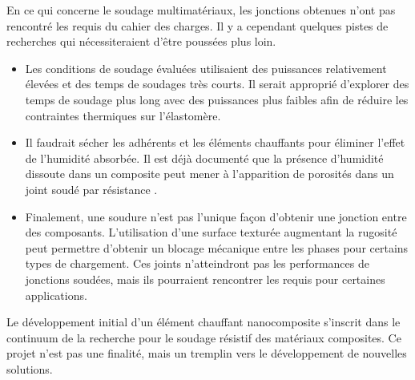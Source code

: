 En ce qui concerne le soudage multimatériaux, les jonctions obtenues n'ont pas rencontré les requis du cahier des charges. 
Il y a cependant quelques pistes de recherches qui nécessiteraient d'être poussées plus loin. 

\begin{itemize}
	\item Les conditions de soudage évaluées utilisaient des puissances relativement élevées et des temps de soudages très courts. 
	Il serait approprié d'explorer des temps de soudage plus long avec des puissances plus faibles afin de réduire les contraintes thermiques sur l'élastomère. 
	\item Il faudrait sécher les adhérents et les éléments chauffants pour éliminer l'effet de l'humidité absorbée. 
	Il est déjà documenté que la présence d'humidité dissoute dans un composite peut mener à l'apparition de porosités dans un joint soudé par résistance \cite{Shi2014}. 
	\item Finalement, une soudure n'est pas l'unique façon d'obtenir une jonction entre des composants. 
	L'utilisation d'une surface texturée augmentant la rugosité peut permettre d'obtenir un blocage mécanique entre les phases pour certains types de chargement. 
	Ces joints n'atteindront pas les performances de jonctions soudées, mais ils pourraient rencontrer les requis pour certaines applications. 
\end{itemize}

Le développement initial d'un élément chauffant nanocomposite s'inscrit dans le continuum de la recherche pour le soudage résistif des matériaux composites. 
Ce projet n'est pas une finalité, mais un tremplin vers le développement de nouvelles solutions. 